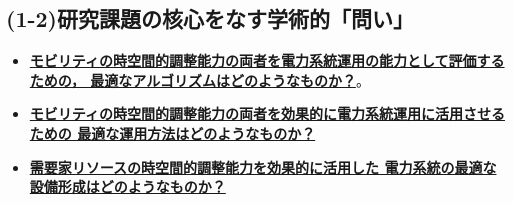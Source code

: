 \documentclass[11pt,a4paper,uplatex,dvipdfmx]{ujarticle} 		%
\newcommand{\研究課題名}{モビリティの時空間調整を活用した電力設備形成構築}
\newcommand{\研究機関名}{名古屋工業大学}
\newcommand{\研究代表者氏名}{中村勇太}
\newcommand{\研究期間の最終元号年度}{10}  %
\begin{document}





\vspace{-1\baselineskip}           %
\subsection*{(1-2)研究課題の核心をなす学術的「問い」}
\vspace{-0.5\baselineskip}           %

\begin{itemize}
	\item \textbf{\ul{モビリティの時空間的調整能力の両者を電力系統運用の能力として評価するための，
	最適なアルゴリズムはどのようなものか？}}。

	\item \textbf{\ul{モビリティの時空間的調整能力の両者を効果的に電力系統運用に活用させるための
	最適な運用方法はどのようなものか？}}

	\item \textbf{\ul{需要家リソースの時空間的調整能力を効果的に活用した
	電力系統の最適な設備形成はどのようなものか？}}	
\end{itemize}
\end{document}
